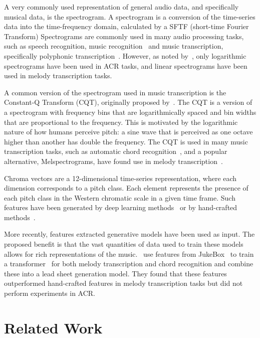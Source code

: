 A very commonly used representation of general audio data, and specifically musical data, is the spectrogram. A spectrogram is a conversion of the time-series data into the time-frequency domain, calculated by a SFTF (short-time Fourier Transform) Spectrograms are commonly used in many audio processing tasks, such as speech recognition, music recognition~\citep{ShazamSpectrogram} and music transcription, specifically polyphonic transcription~\citep{PianoTranscriptionWithTransformer}. However, as noted by~\citet{20YearsofACR}, only logarithmic spectrograms have been used in ACR tasks, and linear spectrograms have been used in melody transcription tasks.

A common version of the spectrogram used in music transcription is the Constant-Q Transform (CQT), originally proposed by~\citet{CQT}. The CQT is a version of a spectrogram with frequency bins that are logarithmically spaced and bin widths that are proportional to the frequency. This is motivated by the logarithmic nature of how humans perceive pitch: a sine wave that is perceived as one octave higher than another has double the frequency. The CQT is used in many music transcription tasks, such as automatic chord recognition~\citep{FirstDeepLearningCQT}, and a popular alternative, Melspectrograms, have found use in melody transcription~\citep{PianoTranscriptionWithTransformer}. 

Chroma vectors are a 12-dimensional time-series representation, where each dimension corresponds to a pitch class. Each element represents the presence of each pitch class in the Western chromatic scale in a given time frame. Such features have been generated by deep learning methods~\citep{BalanceRandomForestACR} or by hand-crafted methods~\citep{NNLSChroma}.

More recently, features extracted generative models have been used as input. The proposed benefit is that the vast quantities of data used to train these models allows for rich representations of the music.~\citet{MelodyTranscriptionViaGenerativePreTraining} use features from JukeBox~\citep{Jukebox} to train a transformer~\citep{AttentionIsAllYouNeed} for both melody transcription and chord recognition and combine these into a lead sheet generation model. They found that these features outperformed hand-crafted features in melody transcription tasks but did not perform experiments in ACR.

\section{Related Work}

